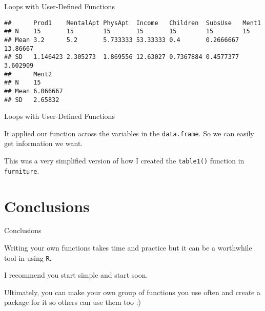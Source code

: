 \begin{frame}[fragile]{Loops with User-Defined Functions}

\begin{Shaded}
\begin{Highlighting}[]
\end{Highlighting}
\end{Shaded}

\begin{verbatim}
##      Prod1    MentalApt PhysApt  Income   Children  SubsUse   Ment1   
## N    15       15        15       15       15        15        15      
## Mean 3.2      5.2       5.733333 53.33333 0.4       0.2666667 13.86667
## SD   1.146423 2.305273  1.869556 12.63027 0.7367884 0.4577377 3.602909
##      Ment2   
## N    15      
## Mean 6.066667
## SD   2.65832
\end{verbatim}

\end{frame}

\begin{frame}[fragile]{Loops with User-Defined Functions}

It applied our function across the variables in the \texttt{data.frame}.
So we can easily get information we want.

This was a very simplified version of how I created the
\texttt{table1()} function in \texttt{furniture}.

\end{frame}

\section{Conclusions}\label{conclusions}

\begin{frame}[fragile]{Conclusions}

Writing your own functions takes time and practice but it can be a
worthwhile tool in using \texttt{R}.

I recommend you start simple and start soon.

Ultimately, you can make your own group of functions you use often and
create a package for it so others can use them too :)

\end{frame}
